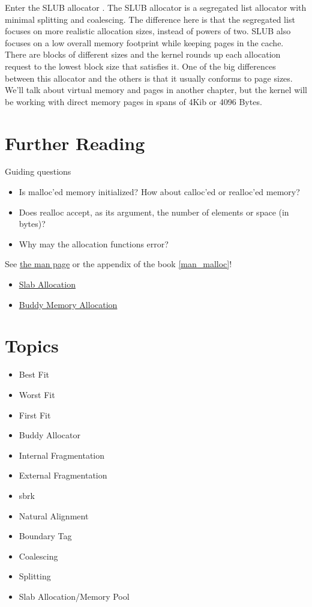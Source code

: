Enter the SLUB allocator .
The SLUB allocator is a segregated list allocator with minimal splitting and coalescing.
The difference here is that the segregated list focuses on more realistic allocation sizes, instead of powers of two.
SLUB also focuses on a low overall memory footprint while keeping pages in the cache.
There are blocks of different sizes and the kernel rounds up each allocation request to the lowest block size that satisfies it.
One of the big differences between this allocator and the others is that it usually conforms to page sizes.
We'll talk about virtual memory and pages in another chapter, but the kernel will be working with direct memory pages in spans of 4Kib or 4096 Bytes.

\section{Further Reading}

Guiding questions

\begin{itemize}
\item Is malloc'ed memory initialized? How about calloc'ed or realloc'ed memory?
\item Does realloc accept, as its argument, the number of elements or space (in bytes)?
\item Why may the allocation functions error?
\end{itemize}

See \href{http://man7.org/linux/man-pages/man3/malloc.3.html}{the man page} or the appendix of the book \ref{man_malloc}!

\begin{itemize}
\item \href{https://en.wikipedia.org/wiki/Slab_allocation}{Slab Allocation}
\item
  \href{http://en.wikipedia.org/wiki/Buddy_memory_allocation}{Buddy Memory Allocation}
\end{itemize}

\section{Topics}

\begin{itemize}
\item
  Best Fit
\item
  Worst Fit
\item
  First Fit
\item
  Buddy Allocator
\item
  Internal Fragmentation
\item
  External Fragmentation
\item
  sbrk
\item
  Natural Alignment
\item
  Boundary Tag
\item
  Coalescing
\item
  Splitting
\item
  Slab Allocation/Memory Pool
\end{itemize}


